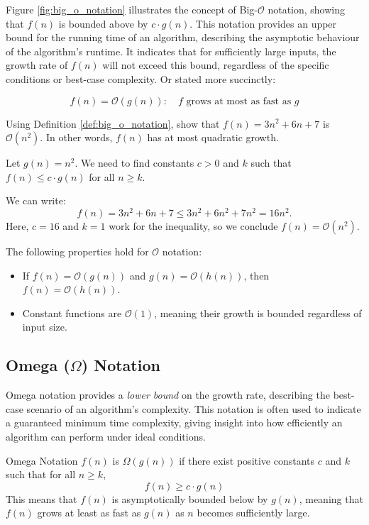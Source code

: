 Figure \ref{fig:big_o_notation} illustrates the concept of Big-$\mathcal{O}$ notation, showing that $f(n)$ is bounded above by $c \cdot g(n)$. This notation provides an upper bound for the running time of an algorithm, describing the asymptotic behaviour of the algorithm’s runtime. It indicates that for sufficiently large inputs, the growth rate of $f(n)$ will not exceed this bound, regardless of the specific conditions or best-case complexity. Or stated more succinctly:

\[
f(n)=\mathcal{O}(g(n)): \quad f \text{ grows at most as fast as } g
\]


\begin{example}
    Using Definition \ref{def:big_o_notation}, show that $f(n)=3n^2+6n+7$ is $\mathcal{O}(n^2)$. In other words, $f(n)$ has at most quadratic growth.
\end{example}

\begin{solution}
    Let $g(n) = n^2$. We need to find constants $c > 0$ and $k$ such that $f(n) \leq c \cdot g(n)$ for all $n \geq k$.
    
    We can write:
    \[
    f(n) = 3n^2 + 6n + 7 \leq 3n^2 + 6n^2 + 7n^2 = 16n^2.
    \]
    Here, $c = 16$ and $k = 1$ work for the inequality, so we conclude $f(n) = \mathcal{O}(n^2)$.
\end{solution}

The following properties hold for $\mathcal{O}$ notation:
\begin{itemize}
    \item If $f(n) = \mathcal{O}(g(n))$ and $g(n) = \mathcal{O}(h(n))$, then $f(n) = \mathcal{O}(h(n))$.
    \item Constant functions are $\mathcal{O}(1)$, meaning their growth is bounded regardless of input size.
\end{itemize}

\subsection*{Omega (\texorpdfstring{$\Omega$}{Omega}) Notation}

Omega notation provides a \textit{lower bound} on the growth rate, describing the best-case scenario of an algorithm’s complexity. This notation is often used to indicate a guaranteed minimum time complexity, giving insight into how efficiently an algorithm can perform under ideal conditions. \newpage

\begin{definition}{Omega Notation}\label{def:omega_notation}
    $f(n)$ is $\Omega(g(n))$ if there exist positive constants $c$ and $k$ such that for all $n \geq k$,
    \medskip
    \[
    f(n) \geq c \cdot g(n)
    \]
    \medskip
    This means that $f(n)$ is asymptotically bounded below by $g(n)$, meaning that $f(n)$ grows at least as fast as $g(n)$ as $n$ becomes sufficiently large.
\end{definition}

